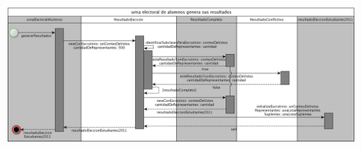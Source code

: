 % 
% 
% 
% 
% 
% 


\begin{center}
\includegraphics[scale=0.2]{diagramas/diagramaUrnaElectoralGeneraResultadosCompletos.png}
\end{center}


